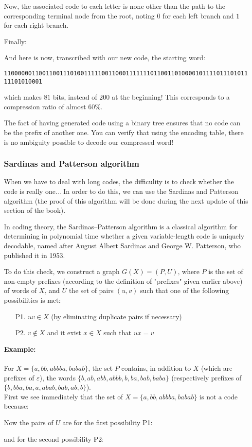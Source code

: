 	Now, the associated code to each letter is none other than the path to the corresponding terminal node from the root, noting $0$ for each left branch and $1$ for each right branch.

	Finally:
	
	And here is now, transcribed with our new code, the starting word:
	\begin{center}
	{\small \texttt{110000001100110011101001111100110001111111011001101000010111101110101111101010001}}
	\end{center}
	which makes $81$ bits, instead of $200$ at the beginning! This corresponds to a compression ratio of almost $60\%$.
	
	The fact of having generated code using a binary tree ensures that no code can be the prefix of another one. You can verify that using the encoding table, there is no ambiguity possible to decode our compressed word!
	
	\subsubsection{Sardinas and Patterson algorithm}
	When we have to deal with long codes, the difficulity is to check whether the code is really one... In order to do this, we can use the Sardinas and Patterson algorithm (the proof of this algorithm will be done during the next update of this section of the book).

	In coding theory, the Sardinas–Patterson algorithm is a classical algorithm for determining in polynomial time whether a given variable-length code is uniquely decodable, named after August Albert Sardinas and George W. Patterson, who published it in 1953.

	To do this check, we construct a graph $G(X)=(P,U)$, where $P$ is the set of non-empty prefixes (according to the definition of "prefixes" given earlier above) of words of $X$, and $U$ the set of pairs $(u, v)$ such that one of the following possibilities is met:
	\begin{enumerate}
		\item[P1.] $uv\in X$ (by eliminating duplicate pairs if necessary)

		\item[P2.] $v\notin X$ and it exist $x\in X$ such that $ux=v$
	\end{enumerate}
	\begin{tcolorbox}[colframe=black,colback=white,sharp corners]
	\textbf{{\Large {}}Example:}\\\\	
	For $X=\{a,bb,abbba,babab\}$, the set $P$ contains, in addition to $X$ (which are prefixes of $\varepsilon$), the words $\{b,ab,abb,abbb,b,ba,bab,baba\}$ (respectively prefixes of $\{b,bba,ba,a,abab,bab,ab,b\}$).\\

	First we see immediately that the set of $X=\{a,bb,abbba,babab\}$ is not a code because:
	
	Now the pairs of $U$ are for the first possibility P1:
	
	and for the second possibility P2:
	\end{tcolorbox}
	
